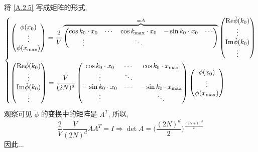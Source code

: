 \begin{itemize}
\begin{tcolorbox}[title=proof:]
		将 \eqref{A.2.5} 写成矩阵的形式,
		\begin{equation}
			\begin{dcases}
				\begin{pmatrix}
					\phi(x_0) \\
					\vdots \\
					\phi(x_{\max})
				\end{pmatrix} = \frac{2}{V} \overbrace{\begin{pmatrix}
					\cos k_0 \cdot x_0 & \cdots & \cos k_{\max} \cdot x_0 & - \sin k_0 \cdot x_0 & \cdots \\
					\vdots & & \ddots & &
				\end{pmatrix}}^{= A} \begin{pmatrix}
					\mathrm{Re} \tilde{\phi}(k_0) \\
					\vdots \\
					\mathrm{Im} \tilde{\phi}(k_0) \\
					\vdots
				\end{pmatrix} \\
				\begin{pmatrix}
					\mathrm{Re} \tilde{\phi}(k_0) \\
					\vdots \\
					\mathrm{Im} \tilde{\phi}(k_0) \\
					\vdots
				\end{pmatrix} = \frac{V}{(2 N)^d} \begin{pmatrix}
					\cos k_0 \cdot x_0 & \cdots & \cos k_0 \cdot x_{\max} \\
					\vdots & \ddots & \\
					- \sin k_0 \cdot x_0 & \cdots & - \sin k_0 \cdot x_{\max} \\
					\vdots & & \ddots
				\end{pmatrix} \begin{pmatrix}
					\phi(x_0) \\
					\vdots \\
					\phi(x_{\max})
				\end{pmatrix}
			\end{dcases}
		\end{equation}
		观察可见 $\tilde{\phi}$ 的变换中的矩阵是 $A^T$, 所以,
		\begin{equation}
			\frac{2}{V} \frac{V}{(2 N)^d} A A^T = I \Longrightarrow \det A = \Big( \frac{(2 N)^d}{2} \Big)^{\frac{(2 N + 1)^d}{2}}
		\end{equation}
		因此...
	\end{tcolorbox}
\end{itemize}
